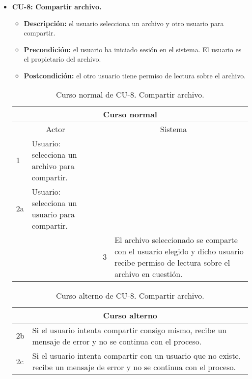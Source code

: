 \begin{itemize}
	\item \textbf{CU-8: Compartir archivo.}
	\begin{itemize}
		\item \textbf{Descripción:} el usuario selecciona un archivo y otro usuario para compartir.
		\item \textbf{Precondición:} el usuario ha iniciado sesión en el sistema. El usuario es el propietario del archivo.
		\item \textbf{Postcondición:} el otro usuario tiene permiso de lectura sobre el archivo.
	\end{itemize}
	\begin{table}[H]
		\centering
		\begin{tabular}{|p{0.3cm}|p{5cm}|p{0.3cm}|p{5cm}|}
			\hline
			\multicolumn{4}{|c|}{Curso normal} \\ \hline
			\multicolumn{2}{|c|}{Actor} & \multicolumn{2}{|c|}{Sistema} \\ \hline
			1 & Usuario: selecciona un archivo para compartir. &  &  \\ \hline
			2a & Usuario: selecciona un usuario para compartir. &  &  \\ \hline
			&  & 3 & El archivo seleccionado se comparte con el usuario elegido y dicho usuario recibe permiso de lectura sobre el archivo en cuestión. \\ \hline
		\end{tabular}
		\caption{Curso normal de CU-8. Compartir archivo.}
		\label{tabla:cu8-normal}
	\end{table}
	
	\begin{table}[H]
		\centering
		\begin{tabular}{|p{0.3cm}|p{10cm}|}
			\hline
			\multicolumn{2}{|c|}{Curso alterno} \\ \hline
			2b & Si el usuario intenta compartir consigo mismo, recibe un mensaje de error y no se continua con el proceso. \\ \hline
			2c & Si el usuario intenta compartir con un usuario que no existe, recibe un mensaje de error y no se continua con el proceso. \\ \hline
		\end{tabular}
		\caption{Curso alterno de CU-8. Compartir archivo.}
		\label{tabla:cu8-alterno}
	\end{table}
\end{itemize}

